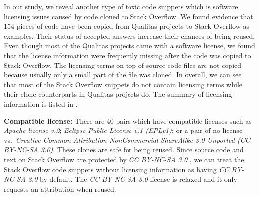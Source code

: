\documentclass[10pt,journal,compsoc]{IEEEtran}
\begin{document}
In our study, we reveal another type of toxic code snippets which is software
licensing issues caused by code cloned to Stack Overflow. We found evidence that
154 pieces of code have been copied from Qualitas projects to Stack Overflow as
examples. Their status of accepted answers increase their chances of being
reused. Even though most of the Qualitas projects came with a software license,
we found that the license information were frequently missing after the code was
copied to Stack Overflow. The licensing terms on top of source code files are
not copied because usually only a small part of the file was cloned. In overall,
we can see that most of the Stack Overflow snippets do not contain licensing
terms while their clone counterparts in Qualitas projects do. The summary of
licensing information is listed in .

\textbf{Compatible license:} There are 40 pairs which have compatible
licenses such as \emph{Apache license v.2}; \emph{Eclipse Public
	License v.1 (EPLv1)}; or a pair of no license vs.~\emph{Creative
	Common Attribution-NonCommercial-ShareAlike 3.0 Unported (CC
	BY-NC-SA 3.0)}. These clones are safe for being reused. Since source
code and text on Stack Overflow are
protected by \emph{CC BY-NC-SA 3.0}
, we can treat the Stack Overflow code snippets
without licensing information as having \emph{CC BY-NC-SA 3.0} by
default. The \emph{CC BY-NC-SA 3.0} license is relaxed and it only
requests an attribution when reused.
\end{document}
